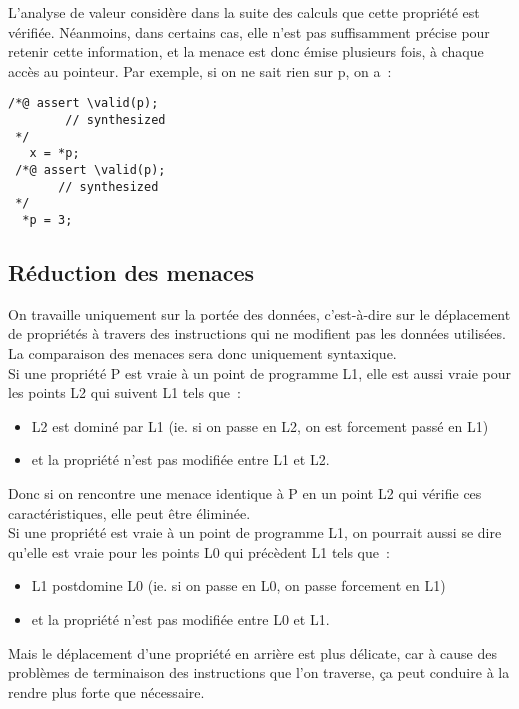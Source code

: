 \documentclass[a4paper,twoside]{article}
\begin{document}
L'analyse de valeur considère dans la suite des calculs que cette propriété
est vérifiée. Néanmoins, dans certains cas, elle n'est pas suffisamment précise
pour retenir cette information, et la menace est donc émise plusieurs fois, à
chaque accès au pointeur. Par exemple, si on ne sait rien sur p,
on a~:
\begin{verbatim}
/*@ assert \valid(p);
        // synthesized
 */
   x = *p;
 /*@ assert \valid(p);
       // synthesized
 */
  *p = 3;
\end{verbatim}

\subsection{Réduction des menaces}

On travaille uniquement sur la portée des données,
c'est-à-dire sur le déplacement de propriétés à travers des instructions
qui ne modifient pas les données utilisées.
La comparaison des menaces sera donc uniquement syntaxique.\\

Si une propriété P est vraie à un point de programme L1, 
elle est aussi vraie pour les points L2 qui suivent L1 tels que~:
\begin{itemize}
  \item L2 est dominé par L1 
(ie. si on passe en L2, on est forcement passé en L1) 
\item et la propriété n'est pas modifiée entre L1 et L2.
\end{itemize}
Donc si on rencontre une menace identique à P en un point L2
qui vérifie ces caractéristiques, elle peut être éliminée.\\

Si une propriété est vraie à un point de programme L1, 
on pourrait aussi se dire qu'elle est
vraie pour les points L0 qui précèdent L1 tels que~:
\begin{itemize}
  \item L1 postdomine L0
    (ie. si on passe en L0, on passe forcement en L1)
  \item  et la propriété n'est pas modifiée entre L0 et L1.
\end{itemize}
Mais le déplacement d'une propriété en arrière est plus délicate,
car à cause des problèmes de terminaison des instructions que l'on traverse,
ça peut conduire à la rendre plus forte que nécessaire.


\end{document}
